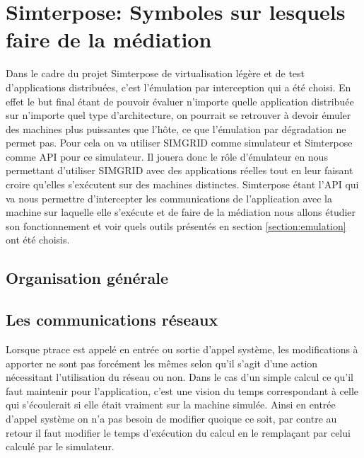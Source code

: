 
\section{Simterpose: Symboles sur lesquels faire de la médiation}
\label{section:simterpose}
Dans le cadre du projet Simterpose de virtualisation légère et de test
d'applications distribuées, c'est l'émulation par interception qui a été
choisi. En effet le but final étant de pouvoir évaluer n'importe quelle
application distribuée sur n'importe quel type d'architecture, on pourrait se
retrouver à devoir émuler des machines plus puissantes que l'hôte, ce que
l'émulation par dégradation ne permet pas. Pour cela on va utiliser SIMGRID
comme simulateur et Simterpose comme API pour ce simulateur. Il jouera donc le
rôle d'émulateur en nous permettant d'utiliser SIMGRID avec des applications
réelles tout en leur faisant croire qu'elles s'exécutent sur des machines
distinctes. Simterpose étant l'API qui va nous permettre d'intercepter les
communications de l'application avec la machine sur laquelle elle s'exécute et
de faire de la médiation nous allons étudier son fonctionnement et voir quels
outils présentés en section \ref{section:emulation} ont été choisis.

\subsection{Organisation générale}

\subsection{Les communications réseaux}

Lorsque ptrace est appelé en entrée ou sortie d'appel système, les modifications
à apporter ne sont pas forcément les mêmes selon qu'il s'agit d'une action
nécessitant l'utilisation du réseau ou non. Dans le cas d'un simple calcul ce
qu'il faut maintenir pour l'application, c'est une vision du temps correspondant
à celle qui s'écoulerait si elle était vraiment sur la machine simulée. Ainsi en
entrée d'appel système on n'a pas besoin de modifier quoique ce soit, par contre
au retour il faut modifier le temps d'exécution du calcul en le remplaçant par
celui calculé par le simulateur.


